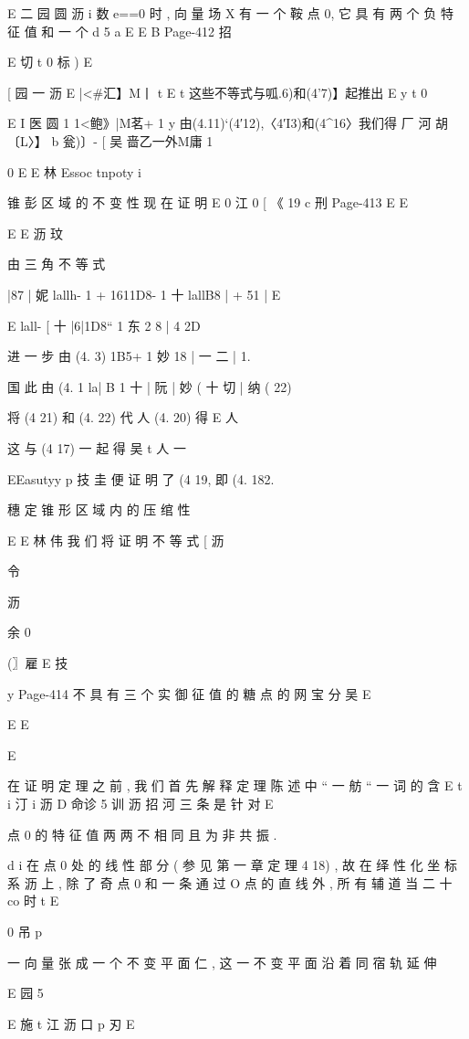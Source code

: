 {{{{{{{{{E 二 园 圆 沥 i
数 e==0 时 , 向 量 场 X 有 一 个 鞍 点 0, 它 具 有 两 个 负 特 征 值 和 一 个
d 5 a
E
E
B
Page-412
招

E 切
t 0 标 )
E

[ 园 一
沥
E |<#汇】M丨 t
E t
这些不等式与呱.6)和(4'7)】起推出
E y
t 0

E
I 医 圆 1 1<鲍》|M茗+ 1 y
由(4.11)`(4′12),〈4′I3)和(4^16〉我们得
厂 河 胡 〔L〉】 b 瓮)〕- [ 吴 啬乙一外M庸 1

0
E
E 林
Essoc tnpoty i

锥 彭 区 域 的 不 变 性
现 在 证 明
E 0
江
0
[ 《 19
c 刑
Page-413
E E

E
E 沥 玟

由 三 角 不 等 式

|87 | 妮 lallh- 1 + 1611D8- 1 十 lallB8 | + 51 |
E

E
lall- [ 十 |6|1D8“ 1 东 2 8 | 4 2D

进 一 步 由 (4. 3)
1B5+ 1 妙 18 | 一 二 | 1.

国 此 由 (4. 1
la| B 1 十 | 阮 | 妙 ( 十 切 | 纳 ( 22)

将 (4 21) 和 (4. 22) 代 人 (4. 20) 得
E 人

这 与 (4 17) 一 起 得
吴 t 人 一

EEasutyy p 技 圭
便 证 明 了 (4 19, 即 (4. 182.

穗 定 锥 形 区 域 内 的 压 绾 性

E
E 林 伟
我 们 将 证 明 不 等 式
[ 沥

令

沥

余
0

(〗雇
E 技

y
Page-414
不 具 有 三 个 实 御 征 值 的 糖 点 的 网 宝 分 吴 E

E
E

E

在 证 明 定 理 之 前 , 我 们 首 先 解 释 定 理 陈 述 中 “ 一 舫 “ 一 词 的 含
E t i 汀 i 沥 D 命诊 5 训 沥 招 河
三 条 是 针 对 E

点 0 的 特 征 值 两 两 不 相 同 且 为 非 共 振 .

d i
在 点 0 处 的 线 性 部 分 ( 参 见 第 一 章 定 理 4 18) , 故 在 绎 性 化 坐 标 系
沥
上 , 除 了 奇 点 0 和 一 条 通 过 O 点 的 直 线 外 , 所 有 辅 道 当 二 十 co 时
t
E

0 吊 p

一
向 量 张 成 一 个 不 变 平 面 仁 , 这 一 不 变 平 面 沿 着 同 宿 轨 延 伸

E
园 5

E 施 t 江 沥 口 p 刃
E

}}}}}}}}}
